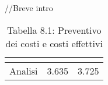 //Breve intro \\
\renewcommand{\arraystretch}{1.5}
\begin{table}[H]
\begin{center}
\begin{tabular}{|c|c|c|}
\hline
\rowcolor{title_row}
\textbf{\color{title_text}{Periodo}}  & \textbf{\color{title_text}{Preventivo}} & \textbf{\color{title_text}{Consuntivo}} \\ \hline
Analisi    & 3.635 & 3.725 \\ \hline
\end{tabular}
\caption{Tabella 8.1: Preventivo dei costi e costi effettivi\label{}}
\end{center}
\end{table}
\renewcommand{\arraystretch}{1}




\pagebreak
